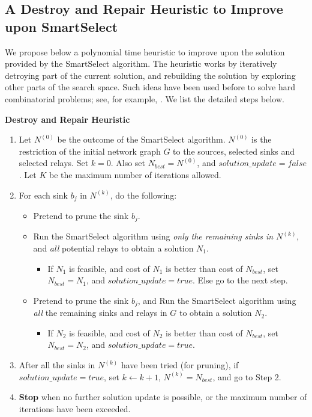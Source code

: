 \documentclass[conference]{IEEEtran}
\newcommand{\gap}{\vspace{2mm}}
\begin{document}
\subsection{A Destroy and Repair Heuristic to Improve upon SmartSelect}
\label{subsec:d-r}
We propose below a polynomial time heuristic to improve upon the solution provided by the SmartSelect algorithm. The heuristic works by iteratively detroying part of the current solution, and rebuilding the solution by exploring other parts of the search space. Such ideas have been used before to solve hard combinatorial problems; see, for example, \cite{Costa}. We list the detailed steps below.

\gap
\noindent
\textbf{Destroy and Repair Heuristic}
\begin{enumerate}
 \item Let $N^{(0)}$ be the outcome of the SmartSelect algorithm. $N^{(0)}$ is the restriction of the initial network graph $G$ to the sources, selected sinks and selected relays. Set $k = 0$. Also set $N_{best}= N^{(0)}$, and $solution\_update = false$. Let $K$ be the maximum number of iterations allowed.
 \item For each sink $b_j$ in $N^{(k)}$, do the following:
 \begin{itemize}
  \item Pretend to prune the sink $b_j$.
  \item Run the SmartSelect algorithm using \emph{only the remaining sinks in $N^{(k)}$}, and \emph{all} potential relays to obtain a solution $N_1$.
  \begin{itemize}
  \item If $N_1$ is feasible, and cost of $N_1$ is better than cost of $N_{best}$, set $N_{best}=N_1$, and $solution\_update = true$. Else go to the next step.
  \end{itemize}
  \item Pretend to prune the sink $b_j$, and Run the SmartSelect algorithm using \emph{all} the remaining sinks and relays in $G$ to obtain a solution $N_2$.
  \begin{itemize}
   \item If $N_2$ is feasible, and cost of $N_2$ is better than cost of $N_{best}$, set $N_{best}=N_2$, and $solution\_update = true$.
  \end{itemize}
 \end{itemize}
\item After all the sinks in $N^{(k)}$ have been tried (for pruning), if $solution\_update = true$, set $k\leftarrow k+1$, $N^{(k)}=N_{best}$, and go to Step 2.
\item \textbf{Stop} when no further solution update is possible, or the maximum number of iterations have been exceeded. 
\end{enumerate}
\end{document}
